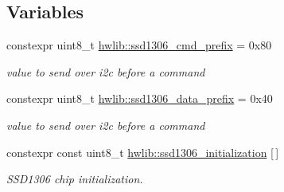 \subsection*{Variables}
\begin{DoxyCompactItemize}
\item 
\mbox{\label{namespacehwlib_a91ba83b9f601b9e5a9d870a7355cd234}} 
constexpr uint8\+\_\+t \hyperlink{namespacehwlib_a91ba83b9f601b9e5a9d870a7355cd234}{hwlib\+::ssd1306\+\_\+cmd\+\_\+prefix} = 0x80
\begin{DoxyCompactList}\small\item\em value to send over i2c before a command \end{DoxyCompactList}\item 
\mbox{\label{namespacehwlib_a7a3622c80f998f1fd9e27f9e07e8f55c}} 
constexpr uint8\+\_\+t \hyperlink{namespacehwlib_a7a3622c80f998f1fd9e27f9e07e8f55c}{hwlib\+::ssd1306\+\_\+data\+\_\+prefix} = 0x40
\begin{DoxyCompactList}\small\item\em value to send over i2c before a command \end{DoxyCompactList}\item 
constexpr const uint8\+\_\+t \hyperlink{namespacehwlib_ab32aa8b496b969a1ae47bab09a2c2937}{hwlib\+::ssd1306\+\_\+initialization} \mbox{[}$\,$\mbox{]}
\begin{DoxyCompactList}\small\item\em S\+S\+D1306 chip initialization. \end{DoxyCompactList}\end{DoxyCompactItemize}
